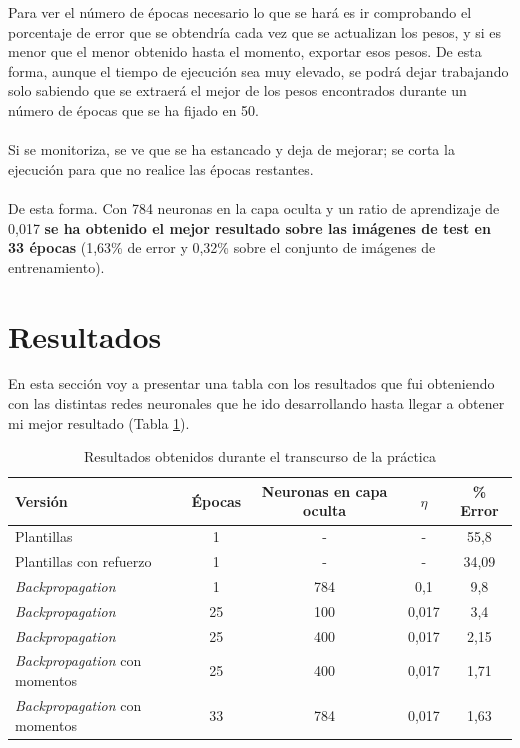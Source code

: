 Para ver el número de épocas necesario lo que se hará es ir comprobando el porcentaje de error que se obtendría cada vez que se actualizan los pesos, y si es menor que el menor obtenido hasta el momento, exportar esos pesos. De esta forma, aunque el tiempo de ejecución sea muy elevado, se podrá dejar trabajando solo sabiendo que se extraerá el mejor de los pesos encontrados durante un número de épocas que se ha fijado en 50.
\\ \\
Si se monitoriza, se ve que se ha estancado y deja de mejorar; se corta la ejecución para que no realice las épocas restantes.
\\ \\
De esta forma. Con 784 neuronas en la capa oculta y un ratio de aprendizaje de 0,017 \textbf{se ha obtenido el mejor resultado sobre las imágenes de test en 33 épocas} (1,63\% de error y 0,32\% sobre el conjunto de imágenes de entrenamiento).

\section{Resultados}

En esta sección voy a presentar una tabla con los resultados que fui obteniendo con las distintas redes neuronales que he ido desarrollando hasta llegar a obtener mi mejor resultado (Tabla \ref{tab:results}).

\begin{table}[H]
	\centering
	\caption{Resultados obtenidos durante el transcurso de la práctica}
	\label{tab:results}
	\begin{tabular}{| l | c | c | c | c |}
		\hline
		Versión & Épocas & Neuronas en capa oculta & $\eta$ & \% Error \\ 
		\hline
		Plantillas & 1 & - & - & 55,8 \\
		Plantillas con refuerzo & 1 & - & - & 34,09 \\
		\textit{Backpropagation} & 1 & 784 & 0,1 & 9,8 \\
		\textit{Backpropagation} & 25 & 100 & 0,017 & 3,4 \\
		\textit{Backpropagation} & 25 & 400 & 0,017 & 2,15 \\
		\textit{Backpropagation} con momentos & 25 & 400 & 0,017 & 1,71 \\
		\textit{Backpropagation} con momentos & 33 & 784 & 0,017 & 1,63 \\
		\hline
	\end{tabular}
\end{table}

